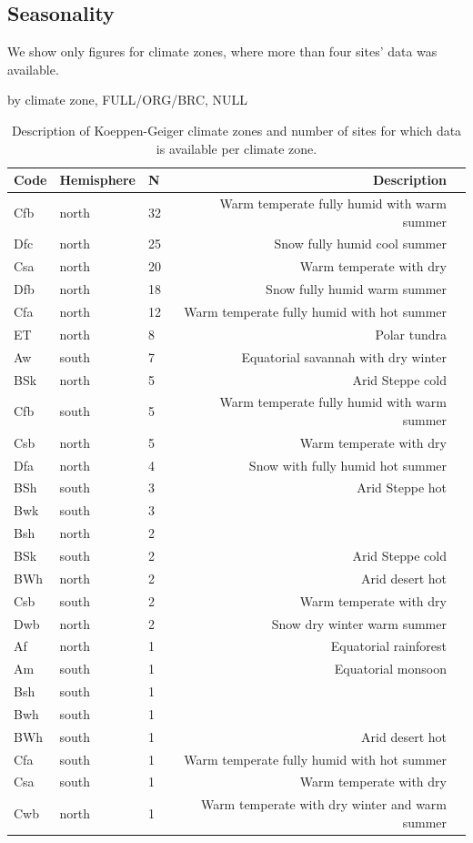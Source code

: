 \documentclass{myreport}
\begin{document}
\clearpage

\subsection{Seasonality}
 
 We show only figures for climate zones, where more than four sites' data was available.
 
 by climate zone, FULL/ORG/BRC, NULL
 
\begin{table}
\caption{Description of Koeppen-Geiger climate zones and number of sites for which data is available per climate zone.} 
\centering
\begin{tabular}{lllrl}
  \toprule
  Code & Hemisphere & N & Description \\ 
  \midrule
   Cfb & north & 32 & Warm temperate fully humid with warm summer \\ 
   Dfc & north & 25 & Snow fully humid cool summer \\ 
   Csa & north & 20 & Warm temperate with dry \\ 
   Dfb & north & 18 & Snow fully humid warm summer \\ 
   Cfa & north & 12 & Warm temperate fully humid with hot summer \\ 
   ET & north & 8 & Polar tundra \\ 
   Aw & south & 7 & Equatorial savannah with dry winter \\ 
   BSk & north & 5 & Arid Steppe cold \\ 
   Cfb & south & 5 & Warm temperate fully humid with warm summer \\ 
   Csb & north & 5 & Warm temperate with dry \\ 
  \midrule
   Dfa & north & 4 & Snow with fully humid hot summer \\ 
   BSh & south & 3 & Arid Steppe hot \\ 
   Bwk & south & 3 &  \\ 
   Bsh & north & 2 &  \\ 
   BSk & south & 2 & Arid Steppe cold \\ 
   BWh & north & 2 & Arid desert hot \\ 
   Csb & south & 2 & Warm temperate with dry \\ 
   Dwb & north & 2 & Snow dry winter warm summer \\ 
   Af & north & 1 & Equatorial rainforest \\ 
   Am & south & 1 & Equatorial monsoon \\ 
   Bsh & south & 1 &  \\ 
   Bwh & south & 1 &  \\ 
   BWh & south & 1 & Arid desert hot \\ 
   Cfa & south & 1 & Warm temperate fully humid with hot summer \\ 
   Csa & south & 1 & Warm temperate with dry \\ 
   Cwb & north & 1 & Warm temperate with dry winter and warm summer \\ 
   \bottomrule
  \end{tabular}
  \label{tab:kgclimate}
\end{table}
\end{document}
